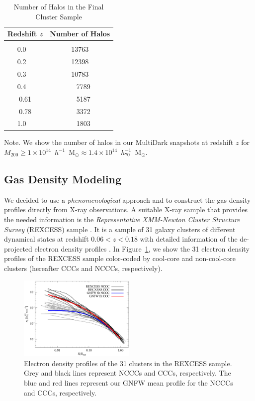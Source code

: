 \documentclass[traditabstract]{aa}
\begin{document}
\begin{table}[t]
\begin{center}
\caption{Number of Halos in the Final Cluster Sample}
\medskip
\begin{tabular}{cc}
\hline
\phantom{\Big|}
Redshift $z$ & Number of Halos \\
\hline\\[-0.5em]
 0.0~~ &  13763\\
 0.2~~ &  12398\\
 0.3~~ &  10783\\ 
 0.4~~ &   ~~7789\\ 
 0.61  &  ~~5187\\ 
 0.78  &  ~~3372\\ 
 1.0~~ &  ~~1803\\[0.5em]
\hline
\end{tabular}
\label{tab:z}
\end{center}
\footnotesize{Note. We show the number of halos in our MultiDark snapshots at redshift $z$ for $M_{200}\geq1\times10^{14}$~$h^{-1}$~M$_{\odot}\approx1.4\times10^{14}$~$h_{70}^{-1}$~M$_{\odot}$. }
\end{table}


\subsection{Gas Density Modeling}
\label{sec:2.2}

We decided to use a \emph{phenomenological} approach and to construct the gas
density profiles directly from X-ray observations. A suitable X-ray sample that
provides the needed information is the \emph{Representative XMM-Newton Cluster
  Structure Survey} (REXCESS) sample \citep{2008A&A...487..431C,
  2009A&A...498..361P}. It is a sample of 31 galaxy clusters of different
dynamical states at redshift $0.06<z<0.18$ with detailed information of the
de-projected electron density profiles \citep{2008A&A...487..431C}. In
Figure~\ref{fig:gas_profiles}, we show the 31 electron density profiles of the
REXCESS sample color-coded by cool-core and non-cool-core clusters (hereafter
CCCs and NCCCs, respectively).

\begin{figure}[t]
\centering
\includegraphics[width=0.5\textwidth]{figures/gas_profiles.eps}
\caption{Electron density profiles of the 31 clusters in the REXCESS sample. Grey and black lines represent NCCCs and CCCs, respectively. The blue and red lines represent our GNFW mean profile for the NCCCs and CCCs, respectively.}
\label{fig:gas_profiles}
\end{figure}
\end{document}
